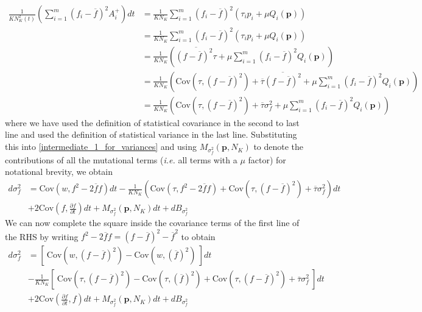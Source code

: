\begin{align}
\frac{1}{KN^2_{K}(t)}\left(\sum\limits_{i=1}^{m}(f_i-\overline{f})^2A_i^+\right)dt &= \frac{1}{KN_{K}}\sum\limits_{i=1}^{m}(f_i-\overline{f})^2\left(\tau_ip_i + \mu Q_i(\mathbf{p})\right)\\
&= \frac{1}{KN_K}\sum\limits_{i=1}^{m}\left(f_i - \overline{f}\right)^2\left(\tau_ip_i + \mu Q_i(\mathbf{p})\right)\\
&= \frac{1}{KN_K}\left(\overline{\left(f - \overline{f}\right)^2\tau}+\mu \sum\limits_{i=1}^{m}\left(f_i - \overline{f}\right)^2Q_i(\mathbf{p})\right)\\
&= \frac{1}{KN_K}\left(\textrm{Cov}(\tau,\left(f - \overline{f}\right)^2) + \overline{\tau}\overline{\left(f - \overline{f}\right)^2} +\mu \sum\limits_{i=1}^{m}\left(f_i - \overline{f}\right)^2Q_i(\mathbf{p})\right)\\
&= \frac{1}{KN_K}\left(\textrm{Cov}(\tau,\left(f - \overline{f}\right)^2) + \overline{\tau}\sigma^2_{f} +\mu \sum\limits_{i=1}^{m}\left(f_i - \overline{f}\right)^2Q_i(\mathbf{p})\right)
\end{align}
where we have used the definition of statistical covariance in the second to last line and used the definition of statistical variance in the last line. Substituting this into \eqref{intermediate_1_for_variances} and using $M_{\sigma^2_f}(\mathbf{p},N_K)$ to denote the contributions of all the mutational terms (\emph{i.e.} all terms with a $\mu$ factor) for notational brevity, we obtain
\begin{equation}
\begin{aligned}
d\sigma^2_{f} &= \textrm{Cov}(w,f^2 - 2\overline{f}f)dt - \frac{1}{KN_K}\left(\textrm{Cov}(\tau,f^2 - 2\overline{f}f) + \textrm{Cov}(\tau,\left(f - \overline{f}\right)^2) + \overline{\tau}\sigma^2_{f}\right)dt\\
&+ 2\textrm{Cov}\left(f, \frac{\partial f}{\partial t}\right)dt + M_{\sigma^2_f}(\mathbf{p},N_K)dt + dB_{\sigma^2_{f}}
\end{aligned}
\end{equation}
We can now complete the square inside the covariance terms of the first line of the RHS by writing $f^2 - 2\overline{f}f = (f - \overline{f})^2 - \overline{f}^2$ to obtain
\begin{equation}
\label{intermediate_2_for_variances}
\begin{aligned}
d\sigma^2_{f} &= \left[ \ \textrm{Cov}\left(w,(f - \overline{f})^2\right)-\textrm{Cov}\left(w, {\left(\overline{f}\right)}^2\right) \ \right]dt\\[12pt]
&- \frac{1}{KN_K}\left[ \ \textrm{Cov}\left(\tau,(f - \overline{f})^2\right) - \textrm{Cov}\left(\tau, {\left(\overline{f}\right)}^2\right) + \textrm{Cov}(\tau,\left(f - \overline{f}\right)^2) + \overline{\tau}\sigma^2_{f} \ \right]dt\\[12pt]
& + 2\textrm{Cov}\left(\frac{\partial f}{\partial t},f\right)dt + M_{\sigma^2_f}(\mathbf{p},N_K)dt + dB_{\sigma^2_{f}}
\end{aligned}
\end{equation}

